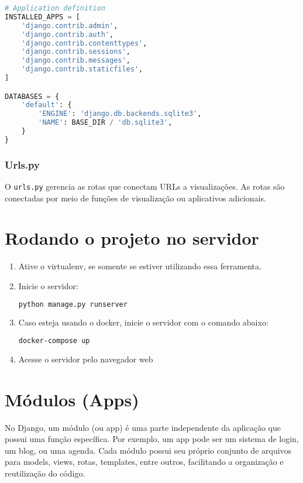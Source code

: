 \begin{lstlisting}[language=Python]
# Application definition
INSTALLED_APPS = [
    'django.contrib.admin',
    'django.contrib.auth',
    'django.contrib.contenttypes',
    'django.contrib.sessions',
    'django.contrib.messages',
    'django.contrib.staticfiles',
]

DATABASES = {
    'default': {
        'ENGINE': 'django.db.backends.sqlite3',
        'NAME': BASE_DIR / 'db.sqlite3',
    }
}
\end{lstlisting}

\subsubsection*{Urls.py}
O \texttt{urls.py} gerencia as rotas que conectam URLs a visualiza\c{c}\~oes. As rotas s\~ao conectadas por meio de fun\c{c}\~oes de visualiza\c{c}\~ao ou aplicativos adicionais.

\section{Rodando o projeto no servidor}

\begin{enumerate}
    \item Ative o virtualenv, se somente se estiver utilizando essa ferramenta.

    \item Inicie o servidor:
\begin{lstlisting}[language=bash]
python manage.py runserver
\end{lstlisting}

    \item Caso esteja usando o docker, inicie o servidor com o comando abaixo:
\begin{lstlisting}[language=bash]
docker-compose up
\end{lstlisting}

    \item Acesse o servidor pelo navegador web
\end{enumerate}

\section{M\'odulos (Apps)}\label{sec:criarapp}

No Django, um m\'odulo (ou app) \'{e} uma parte independente da aplica\c{c}\~ao que possui uma fun\c{c}\~ao espec\'{i}fica. Por exemplo, um app pode ser um sistema de login, um blog, ou uma agenda. Cada m\'odulo possui seu pr\'oprio conjunto de arquivos para models, views, rotas, templates, entre outros, facilitando a organiza\c{c}\~ao e reutiliza\c{c}\~ao do c\'odigo.

